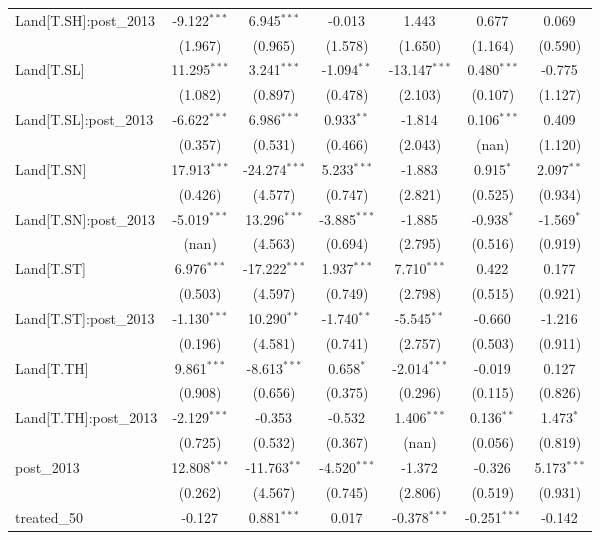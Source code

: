 \begin{table}[!htbp]
\begin{tabular}{@{\extracolsep{5pt}}lcccccc}
 Land[T.SH]:post_2013 & -9.122$^{***}$ & 6.945$^{***}$ & -0.013$^{}$ & 1.443$^{}$ & 0.677$^{}$ & 0.069$^{}$ \\
  & (1.967) & (0.965) & (1.578) & (1.650) & (1.164) & (0.590) \\
 Land[T.SL] & 11.295$^{***}$ & 3.241$^{***}$ & -1.094$^{**}$ & -13.147$^{***}$ & 0.480$^{***}$ & -0.775$^{}$ \\
  & (1.082) & (0.897) & (0.478) & (2.103) & (0.107) & (1.127) \\
 Land[T.SL]:post_2013 & -6.622$^{***}$ & 6.986$^{***}$ & 0.933$^{**}$ & -1.814$^{}$ & 0.106$^{***}$ & 0.409$^{}$ \\
  & (0.357) & (0.531) & (0.466) & (2.043) & (nan) & (1.120) \\
 Land[T.SN] & 17.913$^{***}$ & -24.274$^{***}$ & 5.233$^{***}$ & -1.883$^{}$ & 0.915$^{*}$ & 2.097$^{**}$ \\
  & (0.426) & (4.577) & (0.747) & (2.821) & (0.525) & (0.934) \\
 Land[T.SN]:post_2013 & -5.019$^{***}$ & 13.296$^{***}$ & -3.885$^{***}$ & -1.885$^{}$ & -0.938$^{*}$ & -1.569$^{*}$ \\
  & (nan) & (4.563) & (0.694) & (2.795) & (0.516) & (0.919) \\
 Land[T.ST] & 6.976$^{***}$ & -17.222$^{***}$ & 1.937$^{***}$ & 7.710$^{***}$ & 0.422$^{}$ & 0.177$^{}$ \\
  & (0.503) & (4.597) & (0.749) & (2.798) & (0.515) & (0.921) \\
 Land[T.ST]:post_2013 & -1.130$^{***}$ & 10.290$^{**}$ & -1.740$^{**}$ & -5.545$^{**}$ & -0.660$^{}$ & -1.216$^{}$ \\
  & (0.196) & (4.581) & (0.741) & (2.757) & (0.503) & (0.911) \\
 Land[T.TH] & 9.861$^{***}$ & -8.613$^{***}$ & 0.658$^{*}$ & -2.014$^{***}$ & -0.019$^{}$ & 0.127$^{}$ \\
  & (0.908) & (0.656) & (0.375) & (0.296) & (0.115) & (0.826) \\
 Land[T.TH]:post_2013 & -2.129$^{***}$ & -0.353$^{}$ & -0.532$^{}$ & 1.406$^{***}$ & 0.136$^{**}$ & 1.473$^{*}$ \\
  & (0.725) & (0.532) & (0.367) & (nan) & (0.056) & (0.819) \\
 post_2013 & 12.808$^{***}$ & -11.763$^{**}$ & -4.520$^{***}$ & -1.372$^{}$ & -0.326$^{}$ & 5.173$^{***}$ \\
  & (0.262) & (4.567) & (0.745) & (2.806) & (0.519) & (0.931) \\
 treated_50 & -0.127$^{}$ & 0.881$^{***}$ & 0.017$^{}$ & -0.378$^{***}$ & -0.251$^{***}$ & -0.142$^{}$ \\

\end{tabular}
\end{table}
